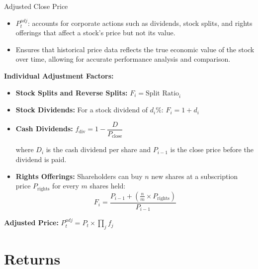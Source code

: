 \documentclass[9pt, aspectratio=169, t]{beamer}
\theoremstyle{definition}
\begin{document}
\begin{frame}{Adjusted Close Price}

\begin{itemize}
    \item $P_t^{adj}$: accounts for corporate actions such as dividends, stock splits, and rights offerings that affect a stock's price but not its value.
    \item Ensures that historical price data reflects the true economic value of the stock over time, allowing for accurate performance analysis and comparison.
\end{itemize}

\vspace{0.2cm}
\textbf{Individual Adjustment Factors:}

\begin{itemize}
    \item \textbf{Stock Splits and Reverse Splits:} $F_i = \text{Split Ratio}_i$
    \item \textbf{Stock Dividends:} For a stock dividend of $d_i\%$: $F_i = 1 + d_i$
    \item \textbf{Cash Dividends:} $f_{\text{div}} = 1 - \dfrac{D}{P_{\text{close}}}$

    where $D_i$ is the cash dividend per share and $P_{i-1}$ is the close price before the dividend is paid.
    \item \textbf{Rights Offerings:} Shareholders can buy $n$ new shares at a subscription price $P_{\text{rights}}$ for every $m$ shares held:
    \[
    F_i = \frac{P_{i-1} + \left(\frac{n}{m} \times P_{\text{rights}}\right)}{P_{i-1}}
    \]
\end{itemize}

\vspace{0.2cm}
\textbf{Adjusted Price:} $\displaystyle P_t^{adj} = P_t \times \prod_{j} f_j$

\end{frame}

\section{Returns}
\end{document}
